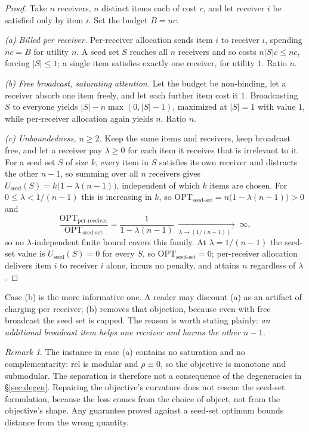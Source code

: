 \documentclass[sigconf,anonymous]{aamas}
\theoremstyle{remark}
\newtheorem{remark}{Remark}
\begin{document}
\begin{proof}
Take $n$ receivers, $n$ distinct items each of cost $c$, and let
receiver $i$ be satisfied only by item $i$. Set the budget $B = nc$.

\emph{(a) Billed per receiver.} Per-receiver allocation sends item $i$
to receiver $i$, spending $nc = B$ for utility $n$. A seed set $S$
reaches all $n$ receivers and so costs $n|S|c \le nc$, forcing
$|S| \le 1$; a single item satisfies exactly one receiver, for
utility $1$. Ratio $n$.

\emph{(b) Free broadcast, saturating attention.} Let the budget be
non-binding, let a receiver absorb one item freely, and let each
further item cost it $1$. Broadcasting $S$ to everyone yields
$|S| - n\max(0,|S|-1)$, maximized at $|S|=1$ with value $1$, while
per-receiver allocation again yields $n$. Ratio $n$.

\emph{(c) Unboundedness, $n \ge 2$.} Keep the same items and
receivers, keep broadcast free, and let a receiver pay $\lambda \ge 0$
for each item it receives that is irrelevant to it. For a seed set $S$
of size $k$, every item in $S$ satisfies its own receiver and
distracts the other $n-1$, so summing over all $n$ receivers gives
$U_{\text{seed}}(S) = k\bigl(1-\lambda(n-1)\bigr)$, independent of
which $k$ items are chosen. For $0 \le \lambda < 1/(n-1)$ this is
increasing in $k$, so $\mathrm{OPT}_{\text{seed-set}} =
n\bigl(1-\lambda(n-1)\bigr) > 0$ and
\[
\frac{\mathrm{OPT}_{\text{per-receiver}}}{\mathrm{OPT}_{\text{seed-set}}}
= \frac{1}{1-\lambda(n-1)} \;\xrightarrow[\lambda \to (1/(n-1))^{-}]{}\; \infty,
\]
so no $\lambda$-independent finite bound covers this family. At
$\lambda = 1/(n-1)$ the seed-set value is $U_{\text{seed}}(S) = 0$ for
every $S$, so $\mathrm{OPT}_{\text{seed-set}} = 0$; per-receiver
allocation delivers item $i$ to receiver $i$ alone, incurs no penalty,
and attains $n$ regardless of $\lambda$.
\end{proof}


Case (b) is the more informative one. A reader may discount (a) as an
artifact of charging per receiver; (b) removes that objection, because
even with free broadcast the seed set is capped. The reason is worth
stating plainly: \emph{an additional broadcast item helps one receiver
and harms the other $n-1$.}

\begin{remark}
The instance in case (a) contains no saturation and no
complementarity: $\mathrm{rel}$ is modular and $\rho \equiv 0$, so the
objective is monotone and submodular. The separation is therefore not
a consequence of the degeneracies in \S\ref{sec:degen}. Repairing the
objective's curvature does not rescue the seed-set formulation,
because the loss comes from the choice of object, not from the
objective's shape. Any guarantee proved against a seed-set optimum
bounds distance from the wrong quantity.
\end{remark}
\end{document}
